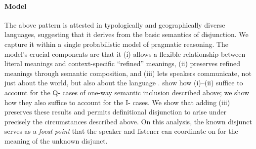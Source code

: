 \documentclass[12pt]{article}
\newcommand{\tech}[1]{\emph{#1}}
\begin{document}
\paragraph{Model} The above pattern is attested in typologically and
geographically diverse languages, suggesting that it derives from the
basic semantics of disjunction. We capture it within a single
probabilistic model of pragmatic reasoning. The model's crucial
components are that it (i) allows a flexible relationship between
literal meanings and context-specific ``refined'' meanings, (ii)
preserves refined meanings through semantic composition, and (iii)
lets speakers communicate, not just about the world, but also about
the language \citep{Smith:Goodman:Frank:2013}.
\citet{bergen-levy-goodman:2014} show how (i)--(ii) suffice to account
for the Q- cases of one-way semantic inclusion described above; we show how they
also suffice to account for the I- cases.  We show that adding (iii)
preserves these results and permits definitional disjunction to arise
under precisely the circumstances described above. On this analysis,
the known disjunct serves as a \tech{focal point} that the speaker and
listener can coordinate on for the meaning of the unknown disjunct.


\let\olditem\item
\renewenvironment{thebibliography}[1]{
\footnotesize
  \paragraph{References}
  \let\par\relax\let\newblock\relax
  \renewcommand{\item}[1][]{\olditem[\textbullet]}%
  \inparaenum
}{\endinparaenum}

\vfill


\begin{spacing}{0.75}

\end{spacing}
\end{document}

